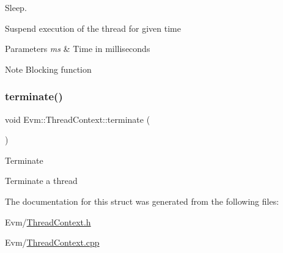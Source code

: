 Sleep. 

Suspend execution of the thread for given time 
\begin{DoxyParams}{Parameters}
{\em ms} & Time in milliseconds \\
\hline
\end{DoxyParams}
\begin{DoxyNote}{Note}
Blocking function 
\end{DoxyNote}
\mbox{\label{struct_evm_1_1_thread_context_aed1e36bdf15b042767c1301d5901ba6c}} 
\subsubsection{\texorpdfstring{terminate()}{terminate()}}
{\footnotesize\ttfamily void Evm\+::\+Thread\+Context\+::terminate (\begin{DoxyParamCaption}{ }\end{DoxyParamCaption})}

Terminate

Terminate a thread 

The documentation for this struct was generated from the following files\+:\begin{DoxyCompactItemize}
\item 
Evm/\mbox{\hyperlink{_thread_context_8h}{Thread\+Context.\+h}}\item 
Evm/\mbox{\hyperlink{_thread_context_8cpp}{Thread\+Context.\+cpp}}\end{DoxyCompactItemize}
